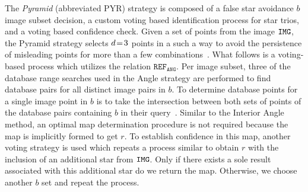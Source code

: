 
The \textit{Pyramid} (abbreviated PYR) strategy is composed of a false star avoidance $b$ image subset decision, a custom voting based identification process for star trios, and a voting based confidence check. 
Given a set of points from the image $\texttt{IMG}$, the Pyramid strategy selects $d\!=\! 3$ points in a such a way to avoid the persistence of misleading points for more than a few combinations~\cite{mortari:pyramidIdentification}.
What follows is a voting-based process which utilizes the relation $\texttt{REF}_\texttt{ANG}$.
Per image subset, three of the database range searches used in the Angle strategy are performed to find database pairs for all distinct image pairs in $b$.
To determine database points for a single image point in $b$ is to take the intersection between both sets of points of the database pairs containing $b$ in their query~\cite{tichy:preliminaryTestsCommericalImagers}.
Similar to the Interior Angle method, an optimal map determination procedure is not required because the map is implicitly formed to get $r$.
To establish confidence in this map, another voting strategy is used which repeats a process similar to obtain $r$ with the inclusion of an additional star from $\texttt{IMG}$.
Only if there exists a sole result associated with this additional star do we return the map.
Otherwise, we choose another $b$ set and repeat the process.


